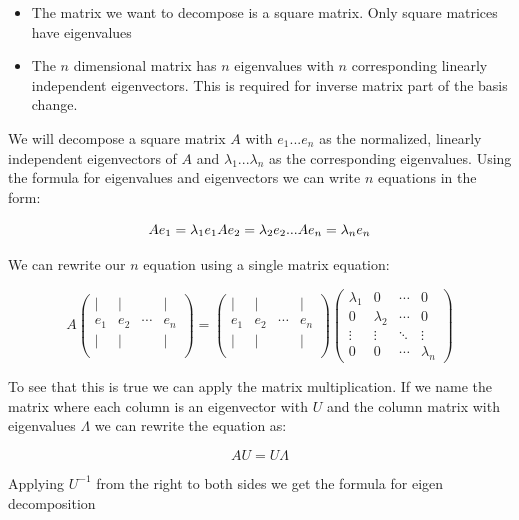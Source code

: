 \begin{itemize}
    \item The matrix we want to decompose is a square matrix. Only square matrices have eigenvalues
    \item The \(n\) dimensional matrix has \(n\) eigenvalues with \(n\) corresponding linearly independent eigenvectors. This is required for inverse matrix part of the basis change.
\end{itemize}

We will decompose a square matrix \(A\) with \(e_1...e_n\) as the normalized, linearly independent eigenvectors of \(A\) and \(\lambda_1...\lambda_n\) as the corresponding eigenvalues. Using the formula for eigenvalues and eigenvectors we can write \(n\) equations in the form:

\[Ae_1 = \lambda_1 e_1 \\ Ae_2 = \lambda_2 e_2 \\ ... \\ Ae_n = \lambda_n e_n\]

We can rewrite our \(n\) equation using a single matrix equation:

\[A\begin{pmatrix}
  | & | &  & | \\
  e_1 & e_2 & \cdots & e_n \\
  | & | &  & | \\
 \end{pmatrix} = \begin{pmatrix}
  | & | &  & | \\
  e_1 & e_2 & \cdots & e_n \\
  | & | &  & | \\
 \end{pmatrix}\begin{pmatrix}
  \lambda_1 & 0 & \cdots & 0 \\
  0 & \lambda_2 & \cdots & 0 \\
  \vdots  & \vdots  & \ddots & \vdots  \\
  0 & 0 & \cdots & \lambda_n
 \end{pmatrix}\]

To see that this is true we can apply the matrix multiplication. If we name the matrix where each column is an eigenvector with \(U\) and the column matrix with eigenvalues \(\Lambda\) we can rewrite the equation as:

\[AU = U\Lambda\]

Applying \(U^{-1}\) from the right to both sides we get the formula for eigen decomposition

